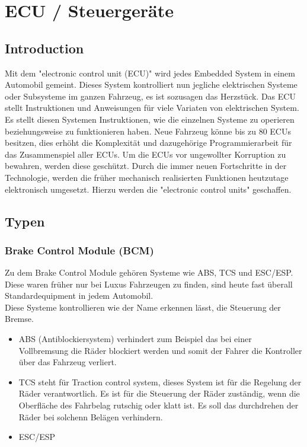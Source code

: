 \section{ECU / Steuergeräte}
    \subsection{Introduction}
    Mit dem "electronic control unit (ECU)" wird jedes Embedded System in einem
    Automobil gemeint. Dieses System kontrolliert nun jegliche elektrischen Systeme
    oder Subsysteme im ganzen Fahrzeug, es ist sozusagen das Herzstück. Das ECU stellt
    Instruktionen und Anweisungen für viele Variaten von elektrischen System. Es stellt
    diesen Systemen Instruktionen, wie die einzelnen Systeme zu operieren beziehungsweise
    zu funktionieren haben. Neue Fahrzeug könne bis zu 80 ECUs besitzen, dies erhöht die
    Komplexität und dazugehörige Programmierarbeit für das Zusammenspiel aller ECUs. Um
    die ECUs vor ungewollter Korruption zu bewahren, werden diese geschützt. Durch die
    immer neuen Fortschritte in der Technologie, werden die früher mechanisch realisierten
    Funktionen heutzutage elektronisch umgesetzt. Hierzu werden die "electronic control units"
    geschaffen.

    \subsection{Typen}
        \subsubsection{Brake Control Module (BCM)}
        Zu dem Brake Control Module gehören Systeme wie ABS, TCS und ESC/ESP. Diese waren früher
        nur bei Luxus Fahrzeugen zu finden, sind heute fast überall Standardequipment in jedem
        Automobil.\\
        Diese Systeme kontrollieren wie der Name erkennen lässt, die Steuerung der Bremse.
        \begin{itemize}
            \item ABS (Antiblockiersystem) verhindert zum Beispiel das bei einer Vollbremsung die Räder
            blockiert werden und somit der Fahrer die Kontroller über das Fahrzeug verliert.
            \item TCS steht für Traction control system, dieses System ist für die Regelung der Räder
            verantwortlich. Es ist für die Steuerung der Räder zuständig, wenn die Oberfläche des Fahrbelag
            rutschig oder klatt ist. Es soll das durchdrehen der Räder bei solchenn Belägen verhindern.
            \item ESC/ESP
        \end{itemize}

